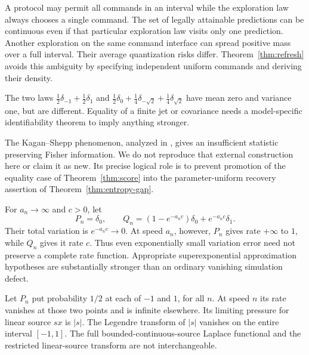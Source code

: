 \begin{example}
A protocol may permit all commands in an interval while the exploration
law always chooses a single command. The set of legally attainable
predictions can be continuous even if that particular exploration law
visits only one prediction. Another exploration on the same command
interface can spread positive mass over a full interval. Their average
quantization risks differ. Theorem~\ref{thm:refresh} avoids this ambiguity
by specifying independent uniform commands and deriving their density.
\end{example}

\begin{example}
The two laws
$\frac12\delta_{-1}+\frac12\delta_1$ and
$\frac12\delta_0+\frac14\delta_{-\sqrt2}+\frac14\delta_{\sqrt2}$
have mean zero and variance one, but are different. Equality of a finite
jet or covariance needs a model-specific identifiability theorem to imply
anything stronger.
\end{example}

\begin{example}
The Kagan--Shepp phenomenon, analyzed in \cite{Pollard2013}, gives an
insufficient statistic preserving Fisher information. We do not reproduce
that external construction here or claim it as new. Its precise logical
role is to prevent promotion of the equality case of
Theorem~\ref{thm:score} into the parameter-uniform recovery assertion of
Theorem~\ref{thm:entropy-gap}.
\end{example}

\begin{example}
For $a_n\to\infty$ and $c>0$, let
\[
 P_n=\delta_0,\qquad
 Q_n=(1-e^{-a_nc})\delta_0+e^{-a_nc}\delta_1.
\]
Their total variation is $e^{-a_nc}\to0$. At speed $a_n$, however,
$P_n$ gives rate $+\infty$ to $1$, while $Q_n$ gives it rate $c$.
Thus even exponentially small variation error need not preserve a complete
rate function. Appropriate superexponential approximation hypotheses are
substantially stronger than an ordinary vanishing simulation defect.
\end{example}

\begin{example}
Let $P_n$ put probability $1/2$ at each of $-1$ and $1$, for all $n$.
At speed $n$ its rate vanishes at those two points and is infinite elsewhere.
Its limiting pressure for linear source $sx$ is $|s|$. The Legendre
transform of $|s|$ vanishes on the entire interval $[-1,1]$.
The full bounded-continuous-source Laplace functional and the restricted
linear-source transform are not interchangeable.
\end{example}

